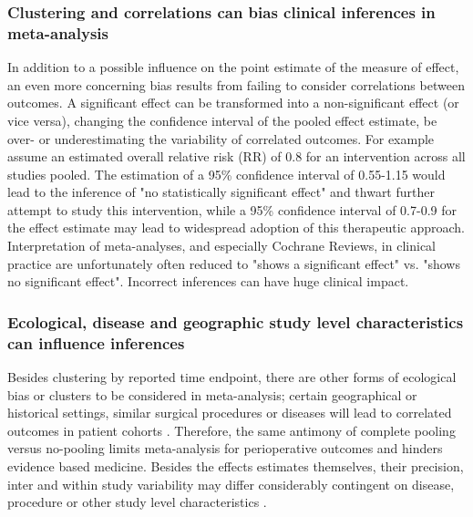 \documentclass[11pt,notitlepage]{article}
\begin{document}
\subsubsection*{Clustering and correlations can bias clinical inferences in meta-analysis }
In addition to a possible influence on the point estimate of the measure of effect, an even more concerning bias results from failing to consider correlations between outcomes. A significant effect can be transformed into a non-significant effect (or vice versa), changing the confidence interval of the pooled effect estimate, be over- or underestimating the variability of correlated outcomes. For example assume an estimated overall relative risk (RR) of 0.8 for an intervention across all studies pooled. The estimation of a 95\% confidence interval of 0.55-1.15 would lead to the inference of "no statistically significant effect" and thwart further attempt to study this intervention, while a 95\% confidence interval of 0.7-0.9 for the effect estimate may lead to widespread adoption of this therapeutic approach. Interpretation of meta-analyses, and especially Cochrane Reviews, in clinical practice are unfortunately often reduced to "shows a significant effect" vs. "shows no significant effect". Incorrect inferences can have huge clinical impact.

\subsubsection*{Ecological, disease and geographic study level characteristics can influence inferences}
Besides clustering by reported time endpoint, there are other forms of ecological bias or clusters to be considered in meta-analysis; certain geographical or historical settings, similar surgical procedures or diseases will lead to correlated outcomes in patient cohorts \cite{Abroug2011,Andreae2013,Andreae2015,Roth2015CriticalCare}. Therefore, the same antimony of complete pooling versus no-pooling limits meta-analysis for perioperative outcomes and hinders evidence based medicine. Besides the effects estimates themselves, their precision, inter and within study variability may differ considerably contingent on disease, procedure or other study level characteristics \cite{Andreae2013,Andreae2015,Roth2015CriticalCare}.
\end{document}
